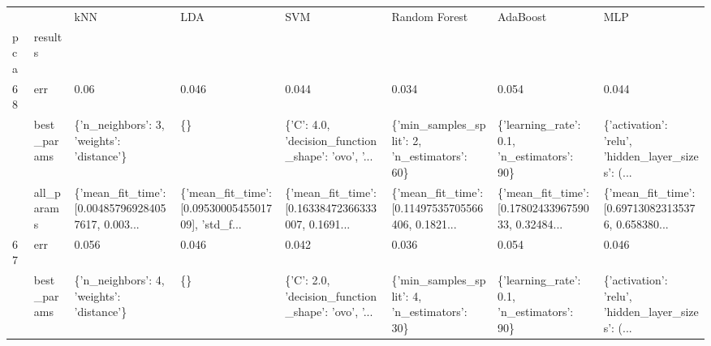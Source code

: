 \begin{tabular}{llllllll}
\toprule
   &            &                                                kNN &                                                LDA &                                                SVM &                                      Random Forest &                                           AdaBoost &                                                MLP \\
pca & results &                                                    &                                                    &                                                    &                                                    &                                                    &                                                    \\
\midrule
68 & err &                                               0.06 &                                              0.046 &                                              0.044 &                                              0.034 &                                              0.054 &                                              0.044 \\
   & best\_params &          \{'n\_neighbors': 3, 'weights': 'distance'\} &                                                 \{\} &  \{'C': 4.0, 'decision\_function\_shape': 'ovo', '... &       \{'min\_samples\_split': 2, 'n\_estimators': 60\} &         \{'learning\_rate': 0.1, 'n\_estimators': 90\} &  \{'activation': 'relu', 'hidden\_layer\_sizes': (... \\
   & all\_params &  \{'mean\_fit\_time': [0.004857969284057617, 0.003... &  \{'mean\_fit\_time': [0.0953000545501709], 'std\_f... &  \{'mean\_fit\_time': [0.16338472366333007, 0.1691... &  \{'mean\_fit\_time': [0.11497535705566406, 0.1821... &  \{'mean\_fit\_time': [0.1780243396759033, 0.32484... &  \{'mean\_fit\_time': [0.697130823135376, 0.658380... \\
67 & err &                                              0.056 &                                              0.046 &                                              0.042 &                                              0.036 &                                              0.054 &                                              0.046 \\
   & best\_params &          \{'n\_neighbors': 4, 'weights': 'distance'\} &                                                 \{\} &  \{'C': 2.0, 'decision\_function\_shape': 'ovo', '... &       \{'min\_samples\_split': 4, 'n\_estimators': 30\} &         \{'learning\_rate': 0.1, 'n\_estimators': 90\} &  \{'activation': 'relu', 'hidden\_layer\_sizes': (... \\

\end{tabular}
